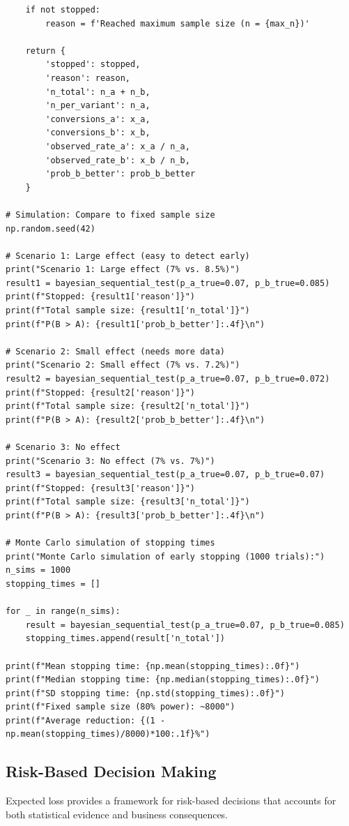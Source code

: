 \begin{lstlisting}
    if not stopped:
        reason = f'Reached maximum sample size (n = {max_n})'

    return {
        'stopped': stopped,
        'reason': reason,
        'n_total': n_a + n_b,
        'n_per_variant': n_a,
        'conversions_a': x_a,
        'conversions_b': x_b,
        'observed_rate_a': x_a / n_a,
        'observed_rate_b': x_b / n_b,
        'prob_b_better': prob_b_better
    }

# Simulation: Compare to fixed sample size
np.random.seed(42)

# Scenario 1: Large effect (easy to detect early)
print("Scenario 1: Large effect (7% vs. 8.5%)")
result1 = bayesian_sequential_test(p_a_true=0.07, p_b_true=0.085)
print(f"Stopped: {result1['reason']}")
print(f"Total sample size: {result1['n_total']}")
print(f"P(B > A): {result1['prob_b_better']:.4f}\n")

# Scenario 2: Small effect (needs more data)
print("Scenario 2: Small effect (7% vs. 7.2%)")
result2 = bayesian_sequential_test(p_a_true=0.07, p_b_true=0.072)
print(f"Stopped: {result2['reason']}")
print(f"Total sample size: {result2['n_total']}")
print(f"P(B > A): {result2['prob_b_better']:.4f}\n")

# Scenario 3: No effect
print("Scenario 3: No effect (7% vs. 7%)")
result3 = bayesian_sequential_test(p_a_true=0.07, p_b_true=0.07)
print(f"Stopped: {result3['reason']}")
print(f"Total sample size: {result3['n_total']}")
print(f"P(B > A): {result3['prob_b_better']:.4f}\n")

# Monte Carlo simulation of stopping times
print("Monte Carlo simulation of early stopping (1000 trials):")
n_sims = 1000
stopping_times = []

for _ in range(n_sims):
    result = bayesian_sequential_test(p_a_true=0.07, p_b_true=0.085)
    stopping_times.append(result['n_total'])

print(f"Mean stopping time: {np.mean(stopping_times):.0f}")
print(f"Median stopping time: {np.median(stopping_times):.0f}")
print(f"SD stopping time: {np.std(stopping_times):.0f}")
print(f"Fixed sample size (80% power): ~8000")
print(f"Average reduction: {(1 - np.mean(stopping_times)/8000)*100:.1f}%")
\end{lstlisting}

\subsection{Risk-Based Decision Making}

Expected loss provides a framework for risk-based decisions that accounts for both statistical evidence and business consequences.

